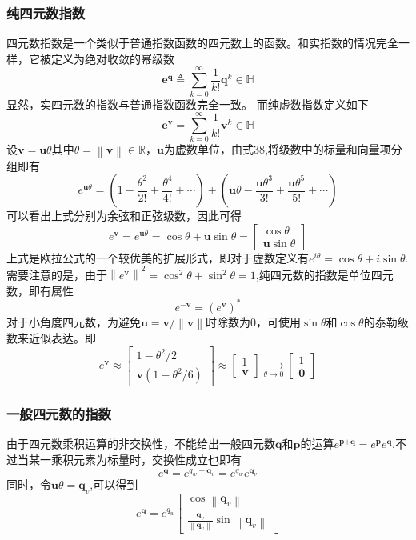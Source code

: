 \documentclass{article}
\begin{document}
\subsubsection{纯四元数指数}
四元数指数是一个类似于普通指数函数的四元数上的函数。和实指数的情况完全一样，它被定义为绝对收敛的幂级数
$$
\textbf{e}^\textbf{q} \triangleq \sum_{k=0}^{\infty}\frac{1}{k!} \textbf{q}^k \in \mathbb{H}
$$显然，实四元数的指数与普通指数函数完全一致。
而纯虚数指数定义如下
$$
\textbf{e}^\textbf{v} = \sum_{k=0}^{\infty}\frac{1}{k!} \textbf{v}^k \in \mathbb{H}
$$设$\textbf{v}=\textbf{u}\theta$其中$\theta = \left\| \textbf{v}\right\|\in \mathbb{R}$，$\textbf{u}$为虚数单位，由式38,将级数中的标量和向量项分组即有
$$
e^{\textbf{u}\theta}=(1-\frac{\theta^{2}}{2!}+\frac{\theta^4}{4!}+\cdots)+(\textbf{u}\theta-\frac{\textbf{u}\theta^3}{3!}+\frac{\textbf{u}\theta^5}{5!} +\cdots )
$$可以看出上式分别为余弦和正弦级数，因此可得
$$
e^\textbf{v} = e^{\textbf{u}\theta} = \cos\theta+\textbf{u}\sin\theta = 
\begin{bmatrix}
    \cos\theta\\
    \textbf{u}\sin\theta
\end{bmatrix}
$$上式是欧拉公式的一个较优美的扩展形式，即对于虚数定义有$e^{i\theta}=\cos\theta+i\sin\theta$.
需要注意的是，由于$\left \| e^\textbf{v}\right \| ^2=\cos ^2 \theta+\sin ^2 \theta=1$,纯四元数的指数是单位四元数，即有属性
$$
e^{-\textbf{v}} = (e^\textbf{v})^*
$$对于小角度四元数，为避免$\textbf{u}=\textbf{v}/\left\|\textbf{v}\right\|$时除数为0，可使用$\sin\theta$和$\cos\theta$的泰勒级数来近似表达。即
$$
e^\textbf{v}\approx \begin{bmatrix}
    1-\theta^2/2\\
    \textbf{v}(1-\theta^2/6)
\end{bmatrix} \approx\begin{bmatrix}
    1\\\textbf{v}
\end{bmatrix}\underset{\theta\rightarrow 0}{\rightarrow}\begin{bmatrix}
    1\\ \textbf{0}
\end{bmatrix}
$$ 
\subsubsection{一般四元数的指数}
由于四元数乘积运算的非交换性，不能给出一般四元数$\textbf{q}和\textbf{p}$的运算$e^{\textbf{p}+\textbf{q}}=e^{\textbf{p}}e^{\textbf{q}}$.不过当某一乘积元素为标量时，交换性成立也即有
$$
e^{\textbf{q}} = e^{q_w+\textbf{q}_v} = e^{q_w}e^{\textbf{q}_v}
$$同时，令$\textbf{u}\theta=\textbf{q}_v$,可以得到
$$
e^{\textbf{q}}=e^{q_w}\begin{bmatrix}
    \cos \left\|\textbf{q}_v\right\|\\
    \frac{\textbf{q}_v}{\left\|\textbf{q}_v\right\|}\sin \left\|\textbf{q}_v\right\|
\end{bmatrix}
\label{46}
$$
\end{document}
